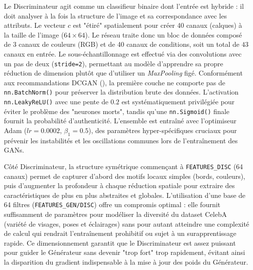 \documentclass{article}
\newcommand{\code}[1]{\colorbox{light-gray}{\texttt{#1}}}
\begin{document}
Le Discriminateur agit comme un classifieur binaire dont l'entrée est hybride : il doit analyser à la fois la structure de l'image et sa correspondance avec les attributs. Le vecteur $c$ est "étiré" spatialement pour créer 40 canaux (calques) à la taille de l'image ($64 \times 64$). Le réseau traite donc un bloc de données composé de $3$ canaux de couleurs (RGB) et de 40 canaux de conditions, soit un total de $43$ canaux en entrée. Le sous-échantillonnage est effectué via des convolutions avec un pas de deux (\code{stride=2}), permettant au modèle d'apprendre sa propre réduction de dimension plutôt que d'utiliser un \textit{MaxPooling} figé. Conformément aux recommandations DCGAN (\cite{dcgan15}), la première couche ne comporte pas de \code{nn.BatchNorm()} pour préserver la distribution brute des données. L'activation \code{nn.LeakyReLU()} avec une pente de $0.2$ est systématiquement privilégiée pour éviter le problème des "neurones morts", tandis qu'une \code{nn.Sigmoid()} finale fournit la probabilité d'authenticité. L'ensemble est entraîné avec l'optimiseur Adam ($lr=0.0002$, $\beta_1=0.5$), des paramètres hyper-spécifiques cruciaux pour prévenir les instabilités et les oscillations communes lors de l'entraînement des GANs.

\medskip

Côté Discriminateur, la structure symétrique commençant à \code{FEATURES\_DISC} (64 canaux) permet de capturer d'abord des motifs locaux simples (bords, couleurs), puis d'augmenter la profondeur à chaque réduction spatiale pour extraire des caractéristiques de plus en plus abstraites et globales. L'utilisation d'une base de 64 filtres (\code{FEATURES\_GEN/DISC}) offre un compromis optimal : elle fournit suffisamment de paramètres pour modéliser la diversité du dataset CelebA (variété de visages, poses et éclairages) sans pour autant atteindre une complexité de calcul qui rendrait l'entraînement prohibitif ou sujet à un surapprentissage rapide. Ce dimensionnement garantit que le Discriminateur est assez puissant pour guider le Générateur sans devenir "trop fort" trop rapidement, évitant ainsi la disparition du gradient indispensable à la mise à jour des poids du Générateur.
\end{document}
